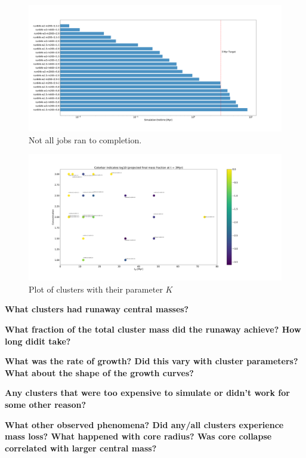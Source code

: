\documentclass[preprint1]{aastex}
\numberwithin{equation}{section}
\begin{document}
\begin{figure}
    \centering
    \includegraphics{JobProgress}
    \caption{Not all jobs ran to completion.}
    \label{fig:JobProgress}
\end{figure}

\begin{figure}
    \centering
    \includegraphics{kplot}
    \caption{Plot of clusters with their parameter $K$}
    \label{fig:KPlot}
\end{figure}
\textbf{What clusters had runaway central masses?}

\textbf{What fraction of the total cluster mass did the runaway achieve?  How long didit take?}

\textbf{What was the rate of growth?  Did this vary with cluster parameters?  What about the shape of the growth curves?}

\textbf{Any clusters that were too expensive to simulate or didn't work for some other reason?}

\textbf{What other observed phenomena?  Did any/all clusters experience mass loss?  What happened with core radius?  Was core collapse correlated with larger central mass?}





\end{document}
